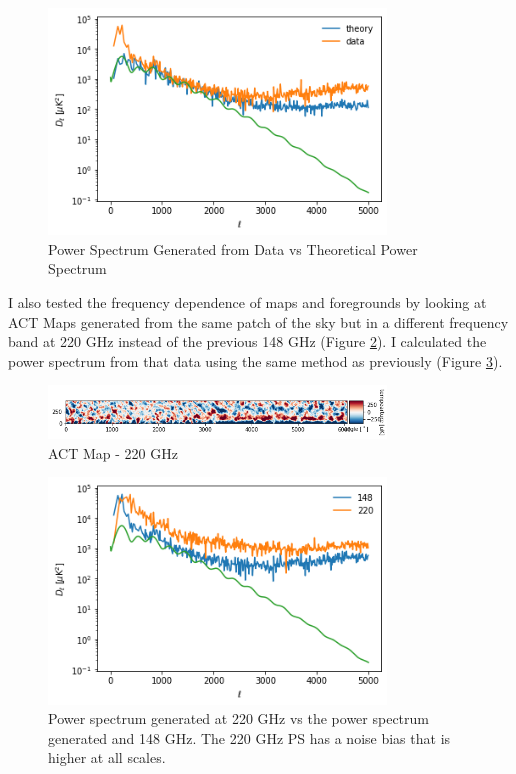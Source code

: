 \documentclass[12pt]{article}
\begin{document}
\begin{figure}[H]
    \centering
    \includegraphics[width=0.8\textwidth]{images/ACT PS.png}
    \caption{Power Spectrum Generated from Data vs Theoretical Power Spectrum}
    \label{fig:compute_theory}
\end{figure}

I also tested the frequency dependence of maps and foregrounds by looking at ACT Maps generated from the same patch of the sky but in a different frequency band at 220 GHz instead of the previous 148 GHz (Figure \ref{fig:220}). I calculated the power spectrum from that data using the same method as previously (Figure \ref{fig:220_spectrum}).

\begin{figure}[H]
    \centering
    \includegraphics[width=0.8\textwidth]{images/diff fb act.png}
    \caption{ACT Map - 220 GHz}
    \label{fig:220}
\end{figure}

\begin{figure}[H]
    \centering
    \includegraphics[width=0.8\textwidth]{images/PS 220.png}
    \caption{Power spectrum generated at 220 GHz vs the power spectrum generated and 148 GHz. The 220 GHz PS has a noise bias that is higher at all scales.}
    \label{fig:220_spectrum}
\end{figure}
\end{document}
